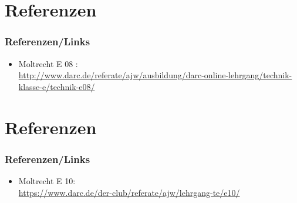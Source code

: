 \section*{Referenzen}
\begin{frame}
    \frametitle{Referenzen/Links}
    
    \footnotesize
    \begin{itemize}
        \item Moltrecht E 08 : \\
              \url{http://www.darc.de/referate/ajw/ausbildung/darc-online-lehrgang/technik-klasse-e/technik-e08/}      
    \end{itemize}

\end{frame}

\section*{Referenzen}
\begin{frame}
  \frametitle{Referenzen/Links}

    \footnotesize
    \begin{itemize}
      \item Moltrecht E 10: \\
        \url{https://www.darc.de/der-club/referate/ajw/lehrgang-te/e10/}
    \end{itemize}

\end{frame}



